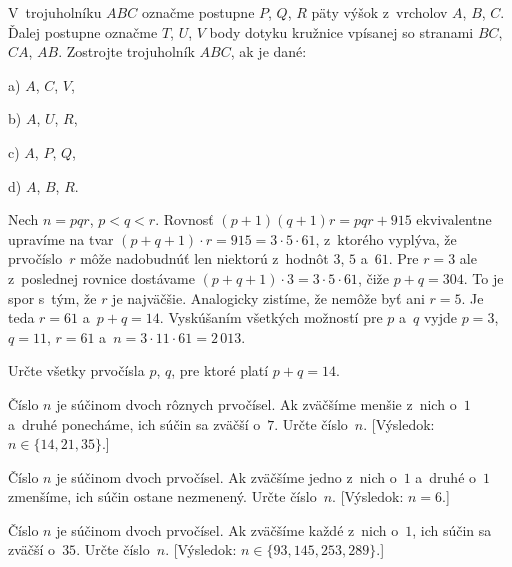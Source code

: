 {V~trojuholníku $ABC$ označme postupne $P$, $Q$, $R$ päty
výšok z~vrcholov $A$, $B$, $C$. Ďalej postupne označme $T$, $U$, $V$
 body dotyku kružnice vpísanej so stranami $BC$, $CA$, $AB$.
Zostrojte trojuholník $ABC$, ak je dané:
\item{a)} $A$, $C$, $V$,
\item{b)} $A$, $U$, $R$,
\item{c)} $A$, $P$, $Q$,
\item{d)} $A$, $B$, $R$.
}

{%
Nech $n = pqr $, $p < q < r$. Rovnosť $(p + 1)(q + 1)r = pqr + 915$ ekvivalentne upravíme
na tvar $(p + q + 1)\cdot r = 915 = 3\cdot5\cdot61$, z~ktorého vyplýva, že prvočíslo~$r$ môže nadobudnúť len niektorú
z~hodnôt $3$, $5$ a~$61$. Pre $r = 3$ ale z~poslednej rovnice dostávame $(p + q + 1)\cdot3 = 3\cdot5\cdot61$,
čiže $p + q = 304$. To je spor s~tým, že $r$ je najväčšie. Analogicky zistíme, že
nemôže byť ani $r = 5$. Je teda $r = 61$ a~$p + q = 14$. Vyskúšaním všetkých možností pre $p$ a~$q$
vyjde $p = 3$, $q = 11$, $r = 61$ a~$n = 3\cdot11\cdot61 = 2\,013$.


Určte všetky prvočísla $p$, $q$, pre ktoré platí $p + q = 14$.

Číslo $n$ je súčinom dvoch rôznych prvočísel. Ak zväčšíme
menšie z~nich o~$1$ a~druhé ponecháme, ich súčin sa zväčší o~$7$. Určte
číslo~$n$. [Výsledok: $n\in\{14, 21, 35\}$.]

Číslo $n$ je súčinom dvoch prvočísel. Ak zväčšíme jedno z~nich
o~$1$ a~druhé o~$1$ zmenšíme, ich súčin ostane nezmenený. Určte číslo~$n$.
[Výsledok: $n = 6$.]

Číslo $n$ je súčinom dvoch prvočísel. Ak zväčšíme každé z~nich
o~$1$, ich súčin sa zväčší o~$35$. Určte číslo~$n$.
[Výsledok: $n\in\{93,145, 253, 289\}$.]
}

